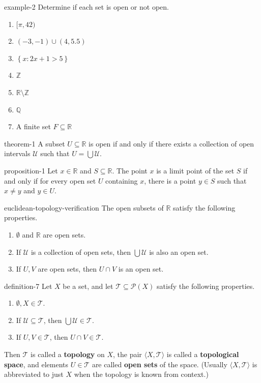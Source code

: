 \documentclass[10pt,]{article}
\newcommand{\terminology}[1]{\textbf{#1}}
\newcommand{\tuple}[1]{\langle #1 \rangle}
\newcommand{\mb}{\mathbb}
\newcommand{\mc}{\mathcal}
\newcommand{\setBuilder}[2]{\left\{#1:#2\right\}}
\begin{document}
\begin{example}{}{example-2}%
\hypertarget{p-24}{}%
Determine if each set is open or not open.%
\leavevmode%
\begin{enumerate}
\item\hypertarget{li-8}{}\([\pi,42)\)%
\item\hypertarget{li-9}{}\((-3,-1)\cup(4,5.5)\)%
\item\hypertarget{li-10}{}\(\setBuilder{x}{2x+1>5}\)%
\item\hypertarget{li-11}{}\(\mb Z\)%
\item\hypertarget{li-12}{}\(\mb R\setminus\mb Z\)%
\item\hypertarget{li-13}{}\(\mb Q\)%
\item\hypertarget{li-14}{}A finite set \(F\subseteq\mb R\)%
\end{enumerate}
\end{example}
\begin{theorem}{}{}{theorem-1}%
\hypertarget{p-25}{}%
A subset \(U\subseteq\mb R\) is open if and only if there exists a collection of open intervals \(\mc U\) such that \(U=\bigcup\mc U\).%
\end{theorem}
\begin{proposition}{}{}{proposition-1}%
\hypertarget{p-26}{}%
Let \(x\in\mb R\) and \(S\subseteq\mb R\). The point \(x\) is a limit point of the set \(S\) if and only if for every open set \(U\) containing \(x\), there is a point \(y\in S\) such that \(x\not=y\) and \(y\in U\).%
\end{proposition}
\begin{theorem}{}{}{euclidean-topology-verification}%
\hypertarget{p-27}{}%
The open subsets of \(\mb R\) satisfy the following properties.%
\leavevmode%
\begin{enumerate}
\item\hypertarget{li-15}{}\(\emptyset\) and \(\mb R\) are open sets.%
\item\hypertarget{li-16}{}If \(\mc U\) is a collection of open sets, then \(\bigcup\mc U\) is also an open set.%
\item\hypertarget{li-17}{}If \(U,V\) are open sets, then \(U\cap V\) is an open set.%
\end{enumerate}
\end{theorem}
\begin{definition}{}{definition-7}%
\hypertarget{p-28}{}%
Let \(X\) be a set, and let \(\mc T\subseteq \mc P(X)\) satisfy the following properties.%
\leavevmode%
\begin{enumerate}
\item\hypertarget{li-18}{}\(\emptyset,X\in\mc T\).%
\item\hypertarget{li-19}{}If \(\mc U\subseteq\mc T\), then \(\bigcup\mc U\in\mc T\).%
\item\hypertarget{li-20}{}If \(U,V\in\mc T\), then \(U\cap V\in\mc T\).%
\end{enumerate}
\hypertarget{p-29}{}%
Then \(\mc T\) is called a \terminology{topology} on \(X\), the pair \(\tuple{X,\mc T}\) is called a \terminology{topological space}, and elements \(U\in\mc T\) are called \terminology{open sets} of the space. (Usually \(\tuple{X,\mc T}\) is abbreviated to just \(X\) when the topology is known from context.)%
\end{definition}
\end{document}
